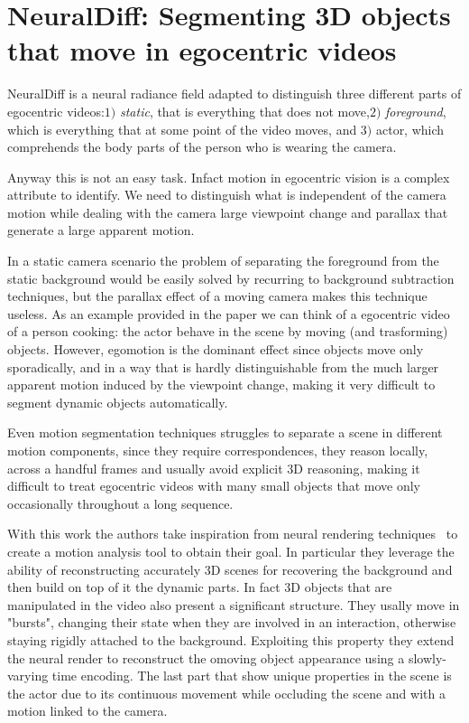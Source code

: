 \section{NeuralDiff: Segmenting 3D objects that move in egocentric videos}
NeuralDiff is a neural radiance field adapted to distinguish three different parts of
egocentric videos:$1)$ \textit{static}, that is everything that does not move,$2)$
\textit{foreground}, which is everything that at some point of the video moves, and $3)$ actor,
which comprehends the body parts of the person who is wearing the camera. 

Anyway this is not an easy task. Infact motion in egocentric vision is a 
complex attribute to identify. We need to distinguish what is 
independent of the camera motion while dealing with the camera large 
viewpoint change and parallax that generate a large apparent motion.

In a static camera scenario the problem of separating the foreground from
the static background would be easily solved by recurring to 
background subtraction techniques, but the parallax effect of a moving camera makes 
this technique useless. As an example provided in the paper we can think of a egocentric
video of a person cooking: the actor behave in the scene by moving (and trasforming) objects.
However, egomotion is the dominant effect since objects move only sporadically,
and in a way that is hardly distinguishable from the much larger apparent motion induced 
by the viewpoint change, making it very difficult to segment dynamic objects automatically.

Even motion segmentation techniques struggles to separate  a scene in different motion components,
since they require correspondences, they reason locally, across a handful frames and usually
avoid explicit 3D reasoning, making it difficult to treat egocentric videos with many small
objects that move only occasionally throughout a long sequence.

With this work the authors take inspiration from neural rendering techniques~\cite{nerf}
to create a motion analysis tool to obtain their goal. In particular they leverage the
ability of reconstructing accurately 3D scenes for recovering the background and then build
on top of it the dynamic parts. In fact 3D objects that are manipulated in the video also
present a significant structure. They usally move in "bursts", changing their state
when they are involved in an interaction, otherwise staying rigidly attached to the 
background. Exploiting this property  they extend the neural render to reconstruct
the omoving object appearance using a slowly-varying time encoding. The last part that 
show unique properties in the scene is the actor due to its continuous movement
while occluding the scene and with a motion linked to the camera.

